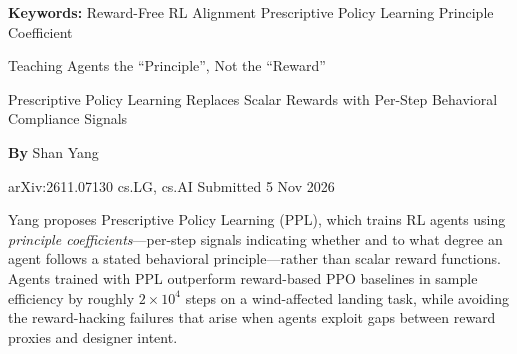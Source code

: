 \documentclass[10pt,twocolumn]{article}
\begin{document}
\setlength{\parindent}{0pt}
\setlength{\parskip}{4pt}

{\small\color{keywordgray}\textbf{Keywords:}
  Reward-Free RL \textbullet{} Alignment \textbullet{} Prescriptive Policy Learning \textbullet{} Principle Coefficient}\par\vspace{4pt}

{\LARGE\bfseries\raggedright Teaching Agents the ``Principle'', Not the ``Reward''}\par\vspace{4pt}
{\large\itshape\raggedright Prescriptive Policy Learning Replaces Scalar Rewards with Per-Step Behavioral Compliance Signals}\par\vspace{6pt}
{\small\textbf{By} Shan Yang}\par\vspace{2pt}
{\small\color{keywordgray}arXiv:2611.07130 \textbullet{} cs.LG, cs.AI \textbullet{} Submitted 5 Nov 2026}
\par\vspace{2pt}\noindent{\color{rulered}\rule{\columnwidth}{0.6pt}}\vspace{6pt}

Yang proposes Prescriptive Policy Learning (PPL), which trains RL agents using \emph{principle coefficients}---per-step signals indicating whether and to what degree an agent follows a stated behavioral principle---rather than scalar reward functions.
Agents trained with PPL outperform reward-based PPO baselines in sample efficiency by roughly $2\times10^4$ steps on a wind-affected landing task, while avoiding the reward-hacking failures that arise when agents exploit gaps between reward proxies and designer intent.
\end{document}
